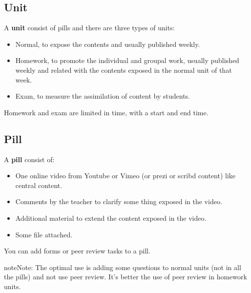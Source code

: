 \documentclass[letterpaper,10pt,english]{sphinxmanual}
\begin{document}
\subsection{Unit}
\label{course_units:unit}
A \textbf{unit} consist of pills and there are three types of units:
\begin{itemize}
\item {} 
Normal, to expose the contents and usually published weekly.

\item {} 
Homework, to promote the individual and groupal work, usually
published weekly and related with the contents exposed in the normal unit of that week.

\item {} 
Exam, to measure the assimilation of content by students.

\end{itemize}

Homework and exam are limited in time, with a start and end time.


\subsection{Pill}
\label{course_units:pill}
A \textbf{pill} consist of:
\begin{itemize}
\item {} 
One online video from Youtube or Vimeo (or prezi or scribd content) like central content.

\item {} 
Comments by the teacher to clarify some thing exposed in the video.

\item {} 
Additional material to extend the content exposed in the video.

\item {} 
Some file attached.

\end{itemize}

You can add forms or peer review tasks to a pill.

\begin{notice}{note}{Note:}
The optimal use is adding some questions to normal units (not in all the pills) and
not use peer review. It's better the use of peer review in homework units.
\end{notice}
\end{document}

